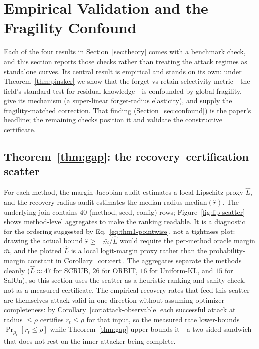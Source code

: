 \documentclass{article}
\begin{document}
\section{Empirical Validation and the Fragility Confound}
\label{sec:validation}
Each of the four results in Section~\ref{sec:theory} comes with a benchmark check, and this section reports those checks rather than treating the attack regimes as standalone curves. Its central result is empirical and stands on its own: under Theorem~\ref{thm:pinsker} we show that the forget-vs-retain selectivity metric---the field's standard test for residual knowledge---is confounded by global fragility, give its mechanism (a super-linear forget-radius elasticity), and supply the fragility-matched correction. That finding (Section~\ref{sec:confound}) is the paper's headline; the remaining checks position it and validate the constructive certificate.

\subsection{Theorem~\ref{thm:gap}: the recovery--certification scatter}
For each method, the margin-Jacobian audit estimates a local Lipschitz proxy $\hat L$, and the recovery-radius audit estimates the median radius $\mathrm{median}(\hat r)$. The underlying join contains $40$ (method, seed, config) rows; Figure~\ref{fig:lip-scatter} shows method-level aggregates to make the ranking readable. It is a diagnostic for the ordering suggested by Eq.~\eqref{eq:thm1-pointwise}, not a tightness plot: drawing the actual bound $\hat r \geq -\bar m/\hat L$ would require the per-method oracle margin $\bar m$, and the plotted $\hat L$ is a local logit-margin proxy rather than the probability-margin constant in Corollary~\ref{cor:cert}. The aggregates separate the methods cleanly ($\hat L \approx 47$ for SCRUB, $26$ for ORBIT, $16$ for Uniform-KL, and $15$ for SalUn), so this section uses the scatter as a heuristic ranking and sanity check, not as a measured certificate. The empirical recovery rates that feed this scatter are themselves attack-valid in one direction without assuming optimizer completeness: by Corollary~\ref{cor:attack-observable} each successful attack at radius $\le\rho$ certifies $r_t\le\rho$ for that input, so the measured rate lower-bounds $\Pr_{\mu_t}[r_t\le\rho]$ while Theorem~\ref{thm:gap} upper-bounds it---a two-sided sandwich that does not rest on the inner attacker being complete.
\end{document}
